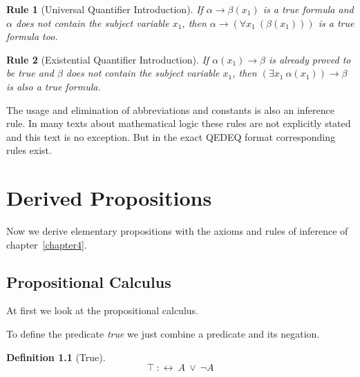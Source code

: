 \documentclass[a4paper,german,10pt,twoside]{book}
\newtheorem{rul}{Rule}
\theoremstyle{definition}
\newtheorem{defn}[thm]{Definition}
\theoremstyle{remark}
\begin{document}
\par


\begin{rul}[Universal Quantifier Introduction]
\label{rule:universalIntroduction} \hypertarget{rule:universalIntroduction}{}
If $\alpha \rightarrow \beta(x_1)$ is a true formula and $\alpha$ does not contain the subject variable $x_1$, then $\alpha \rightarrow (\forall x_1~(\beta(x_1)))$ is a true 
formula too.
\end{rul}




\par


\begin{rul}[Existential Quantifier Introduction]
\label{rule:existentialIntroduction} \hypertarget{rule:existentialIntroduction}{}
If $\alpha(x_1) \rightarrow \beta$ is already proved to be true and $\beta$ does not contain the subject variable $x_1$, then $(\exists x_1~\alpha(x_1)) \rightarrow \beta$ is also a true formula.
\end{rul}




The usage and elimination of abbreviations and constants is also an inference rule. In many texts about mathematical logic these rules are not explicitly stated and this text is no exception. But in the exact QEDEQ format corresponding rules exist.




\chapter{Derived Propositions} \label{chapter5} \hypertarget{chapter5}{}

Now we derive elementary propositions with the axioms and rules of inference of chapter~\ref{chapter4}.

\section{Propositional Calculus} \label{chapter5_section0} \hypertarget{chapter5_section0}{}
At first we look at the propositional calculus.

\par
To define the predicate \emph{true} we just combine a predicate and its negation.

\begin{defn}[True]
\label{definition:True} \hypertarget{definition:True}{}
$$\top\ :\leftrightarrow \ A\ \lor \ \neg A$$

\end{defn}
\end{document}
